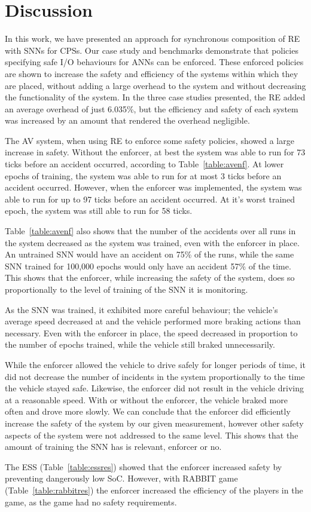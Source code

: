 \section{Discussion}
\label{sec:conclusion}

In this work, we have presented an approach for synchronous composition of \acf{RE} with \acfp{SNN} for \acp{CPS}.
Our case study and benchmarks demonstrate that policies specifying safe I/O behaviours for \acp{ANN} can be enforced.
These enforced policies are shown to increase the safety and efficiency of the systems within which they are placed, without adding a large overhead to the system and without decreasing the functionality of the system.
In the three case studies presented, the \ac{RE} added an average overhead of just 6.035\%, but the efficiency and safety of each system was increased by an amount that rendered the overhead negligible.

The \ac{AV} system, when using \ac{RE} to enforce some safety policies, showed a large increase in safety.
Without the enforcer, at best the system was able to run for 73 ticks before an accident occurred, according to Table~\ref{table:avenf}.
At lower epochs of training, the system was able to run for at most 3 ticks before an accident occurred.
However, when the enforcer was implemented, the system was able to run for up to 97 ticks before an accident occurred.
At it's worst trained epoch, the system was still able to run for 58 ticks.

Table~\ref{table:avenf} also shows that the number of the accidents over all runs in the system decreased as the system was trained, even with the enforcer in place.
An untrained \ac{SNN} would have an accident on 75\% of the runs, while the same \ac{SNN} trained for 100,000 epochs would only have an accident 57\% of the time.
This shows that the enforcer, while increasing the safety of the system, does so proportionally to the level of training of the \ac{SNN} it is monitoring.

As the \ac{SNN} was trained, it exhibited more careful behaviour; the vehicle's average speed decreased at and the vehicle performed more braking actions than necessary.
Even with the enforcer in place, the speed decreased in proportion to the number of epochs trained, while the vehicle still braked unnecessarily.

While the enforcer allowed the vehicle to drive safely for longer periods of time, it did not decrease the number of incidents in the system proportionally to the time the vehicle stayed safe.
Likewise, the enforcer did not result in the vehicle driving at a reasonable speed.
With or without the enforcer, the vehicle braked more often and drove more slowly.
We can conclude that the enforcer did efficiently increase the safety of the system by our given measurement, however other safety aspects of the system were not addressed to the same level.
This shows that the amount of training the \ac{SNN} has is relevant, enforcer or no.

The \ac{ESS} (Table~\ref{table:essres}) showed that the enforcer increased safety by preventing dangerously low \acf{SoC}.
However, with RABBIT game (Table~\ref{table:rabbitres}) the enforcer increased the efficiency of the players in the game, as the game had no safety requirements.










